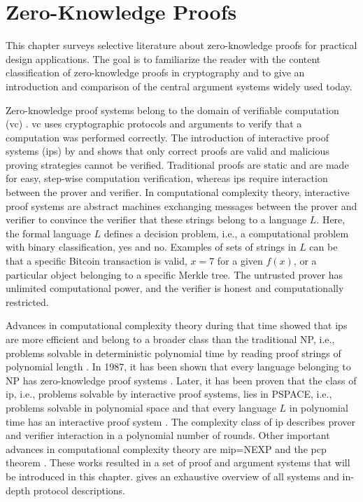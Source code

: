 \chapter{Zero-Knowledge Proofs}
This chapter surveys selective literature about zero-knowledge proofs for practical design applications. The goal is to familiarize the reader with the content classification of zero-knowledge proofs in cryptography and to give an introduction and comparison of the central argument systems widely used today. 

Zero-knowledge proof systems belong to the domain of verifiable computation (\acrshort{vc}) \citep{Simunic, Ahmad}. \acrshort{vc} uses cryptographic protocols and arguments to verify that a computation was performed correctly. The introduction of interactive proof systems (\acrshort{ip}s) by \citet{GoldwasserIPs} and \citet{BabaiIPs} shows that only correct proofs are valid and malicious proving strategies cannot be verified. Traditional proofs are static and are made for easy, step-wise computation verification, whereas \acrshort{ip}s require interaction between the prover and verifier. In computational complexity theory, interactive proof systems are abstract machines exchanging messages between the prover and verifier to convince the verifier that these strings belong to a language \(L\). Here, the formal language \(L\) defines a decision problem, i.e., a computational problem with binary classification, yes and no. Examples of sets of strings in \(L\) can be that a specific Bitcoin transaction is valid, \(x = 7\) for a given \(f(x)\), or a particular object belonging to a specific Merkle tree. The untrusted prover has unlimited computational power, and the verifier is honest and computationally restricted. 

Advances in computational complexity theory during that time showed that \acrshort{ip}s are more efficient and belong to a broader class than the traditional NP, i.e., problems solvable in deterministic polynomial time by reading proof strings of polynomial length \citep{IOPsdisc}. In 1987, it has been shown that every language belonging to NP has zero-knowledge proof systems \citep{anymental10.1145/28395.28420}. Later, it has been proven that the class of \acrshort{ip}, i.e., problems solvable by interactive proof systems, lies in PSPACE, i.e., problems solvable in polynomial space \citep{Shamir10.1145/146585.146609} and that every language \(L\) in polynomial time has an interactive proof system \citep{Lund10.1145/146585.146605}. The complexity class of \acrshort{ip} describes prover and verifier interaction in a polynomial number of rounds. Other important advances in computational complexity theory are \acrshort{mip}=NEXP \citep{Laszlo} and the \acrshort{pcp} theorem \citep{PCPTheorem}. These works resulted in a set of proof and argument systems that will be introduced in this chapter. \citet{Thaler} gives an exhaustive overview of all systems and in-depth protocol descriptions. 

